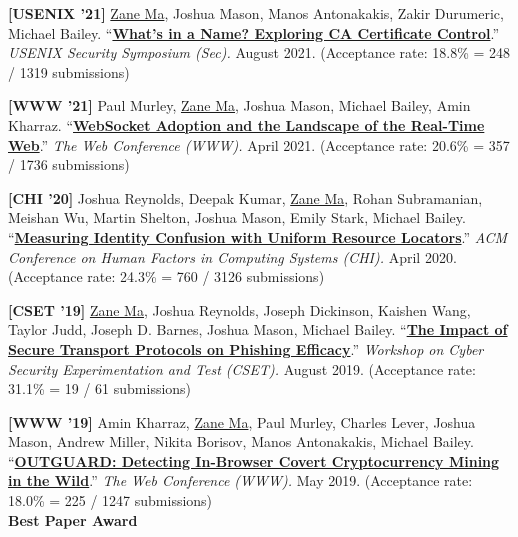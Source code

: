 \documentclass[10pt,singlecolumn]{article} %
\begin{document}
\begin{etaremune}

\item \textbf{[USENIX '21]}
\underline{Zane Ma}, Joshua Mason, Manos Antonakakis, Zakir Durumeric, Michael Bailey.
``\textbf{\href{https://zanema.com/papers/usenix21_ca_operators.pdf}{What's in a Name? Exploring CA Certificate Control}}.''
\emph{USENIX Security Symposium (Sec).} August 2021.
(Acceptance rate: 18.8\% = 248 / 1319 submissions)  
\vspace{6pt}


\item \textbf{[WWW '21]}
Paul Murley, \underline{Zane Ma}, Joshua Mason, Michael Bailey, Amin Kharraz.
``\textbf{\href{https://zanema.com/papers/www21_websockets.pdf}{WebSocket Adoption and the Landscape of the Real-Time Web}}.''
\emph{The Web Conference (WWW).} April 2021.
(Acceptance rate: 20.6\% = 357 / 1736 submissions)
\vspace{6pt}


\item \textbf{[CHI '20]}
Joshua Reynolds, Deepak Kumar, \underline{Zane Ma}, Rohan Subramanian, Meishan Wu, Martin Shelton, Joshua Mason, Emily Stark, Michael Bailey.
``\textbf{\href{https://zanema.com/papers/chi20_urlconfusion.pdf}{Measuring Identity Confusion with Uniform Resource Locators}}.''
\emph{ACM Conference on Human Factors in Computing Systems (CHI).} April 2020.
(Acceptance rate: 24.3\% = 760 / 3126 submissions)
\vspace{6pt}


\item \textbf{[CSET '19]}
\underline{Zane Ma}, Joshua Reynolds, Joseph Dickinson, Kaishen Wang, Taylor Judd, Joseph D. Barnes, Joshua Mason, Michael Bailey.
``\textbf{\href{https://zanema.com/papers/cset19_httpsphishing.pdf}{The Impact of Secure Transport Protocols on Phishing Efficacy}}.''
\emph{Workshop on Cyber Security Experimentation and Test (CSET).} August 2019.
(Acceptance rate: 31.1\% = 19 / 61 submissions)
\vspace{6pt}


\item  \textbf{[WWW '19]}
Amin Kharraz, \underline{Zane Ma}, Paul Murley, Charles Lever, Joshua Mason, Andrew Miller, Nikita Borisov, Manos Antonakakis, Michael Bailey. 
``\textbf{\href{https://zanema.com/papers/www19_cryptojacking.pdf}{OUTGUARD: Detecting In-Browser Covert Cryptocurrency Mining in the Wild}}.''
\emph{The Web Conference (WWW).} May 2019.
(Acceptance rate: 18.0\% = 225 / 1247 submissions) \\
\textbf{\color{headings}Best Paper Award} 
\vspace{6pt}


\end{etaremune}
\end{document}
